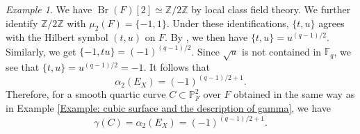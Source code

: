 \documentclass{amsart}
\theoremstyle{definition}
\theoremstyle{remark}
\newtheorem{examp}[prop]{Example}
\DeclareMathOperator{\Br}{Br}
\newcommand{\PP}{\mathbb P}
\newcommand{\ZZ}{\mathbb Z}
\newcommand{\Fq}{\mathbb F_q}
\begin{document}
\begin{examp}
    We have $\Br(F)[2] \simeq \ZZ/2\ZZ $ by local class field theory.
    We further identify $\ZZ/2\ZZ$ with $\mu_2(F)= \{-1, 1 \}$.
    Under these identifications, $\{ t, u \}$ agrees with the Hilbert symbol $(t, u)$ on $F$.
    By \cite[Chapter XIV, Section 3, Corollary]{SerreLocalfields}, we then have $\{ t, u \} = u^{(q-1)/2}$.
    Similarly, we get $\{ -1, tu \} = (-1)^{(q-1)/2}$.
    Since $\sqrt{u}$ is not contained in $\Fq$, we see that $\{ t, u \} = u^{(q-1)/2} =-1$.
    It follows that
    \[
    \alpha_2(E_X)= (-1)^{(q-1)/2+1}.
    \]
    Therefore, for a smooth quartic curve $C \subset \PP^2_{F}$ over $F$ obtained in the same way as in Example \ref{Example: cubic surface and the description of gamma}, we have
    \[
    \gamma(C)=\alpha_2(E_X)= (-1)^{(q-1)/2+1}.
    \]
\end{examp}
\end{document}
